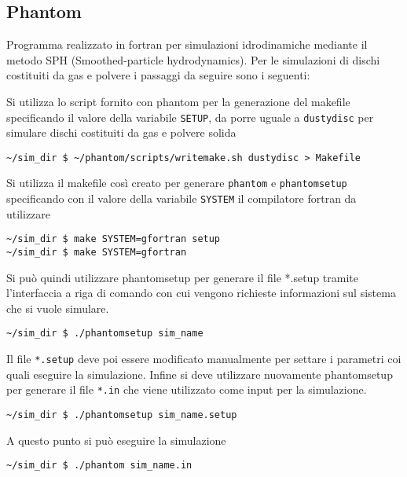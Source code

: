 \documentclass[DIN, pagenumber=false, fontsize=11pt, parskip=half]{scrartcl}
\begin{document}
\subsection{Phantom}

Programma realizzato in fortran per simulazioni idrodinamiche mediante il metodo SPH (Smoothed-particle hydrodynamics). Per le simulazioni di dischi costituiti da gas e polvere i passaggi da seguire sono i seguenti:

Si utilizza lo script fornito con phantom per la generazione del makefile specificando il valore della variabile \lstinline{SETUP}, da porre uguale a \lstinline{dustydisc} per simulare dischi costituiti da gas e polvere solida
\begin{lstlisting}
~/sim_dir $ ~/phantom/scripts/writemake.sh dustydisc > Makefile       
\end{lstlisting}

Si utilizza il makefile così creato per generare \lstinline{phantom} e \lstinline{phantomsetup} specificando con il valore della variabile \lstinline{SYSTEM} il compilatore fortran da utilizzare

\begin{lstlisting}
~/sim_dir $ make SYSTEM=gfortran setup
~/sim_dir $ make SYSTEM=gfortran 
\end{lstlisting}

Si può quindi utilizzare phantomsetup per generare il file *.setup tramite l'interfaccia a riga di comando con cui vengono richieste informazioni sul sistema che si vuole simulare.

\begin{lstlisting}
~/sim_dir $ ./phantomsetup sim_name      
\end{lstlisting}

Il file \lstinline{*.setup} deve poi essere modificato manualmente per settare i parametri coi quali eseguire la simulazione. Infine si deve utilizzare nuovamente phantomsetup per generare il file \lstinline{*.in} che viene utilizzato come input per la simulazione.

\begin{lstlisting}
~/sim_dir $ ./phantomsetup sim_name.setup     
\end{lstlisting}

A questo punto si può eseguire la simulazione

\begin{lstlisting}
~/sim_dir $ ./phantom sim_name.in    
\end{lstlisting}
\end{document}
